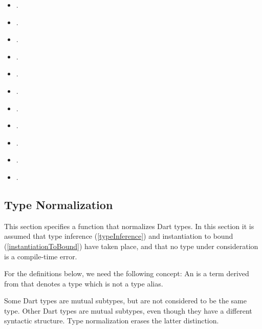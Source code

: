 \documentclass[makeidx]{article}
\begin{document}
{\begin{itemize}
\item {}.
\item {}.
\item {}.
\item {}.
\item {}.
\item {}.
\item {}.
\item {}.
\item {}.
\item {}.
\item {}.
\end{itemize}


\subsection{Type Normalization}

\LMHash{}%
This section specifies a function that normalizes Dart types.
In this section it is assumed that type inference
(\ref{typeInference})
and instantiation to bound
(\ref{instantiationToBound})
have taken place,
and that no type under consideration is a compile-time error.

\LMHash{}%
For the definitions below, we need the following concept:
An 
is a term derived from 
that denotes a type which is not a type alias.


\LMHash{}%
Some Dart types are mutual subtypes,
but are not considered to be the same type.
Other Dart types are mutual subtypes,
even though they have a different syntactic structure.
Type normalization erases the latter distinction.

}
\end{document}
